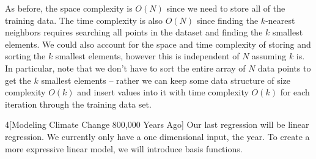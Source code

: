 \documentclass[expanded]{lkx_pset}
\begin{document}
\begin{parts}
  As before, the space complexity is $O(N)$ since we need to store all of the training data. The time complexity is also $O(N)$ since finding the $k$-nearest neighbors requires searching all points in the dataset and finding the $k$ smallest elements. We could also account for the space and time complexity of storing and sorting the $k$ smallest elements, however this is independent of $N$ assuming $k$ is. In particular, note that we don't have to sort the entire array of $N$ data points to get the $k$ smallest elements -- rather we can keep some data structure of size complexity $O(k)$ and insert values into it with time complexity $O(k)$ for each iteration through the training data set.
\end{parts}

\begin{problem}{4}[Modeling Climate Change 800,000 Years Ago]
Our last regression will be linear regression.  We currently only have
a one dimensional input, the year.  To create a more expressive linear
model, we will introduce basis functions.
\end{problem}
\end{document}
